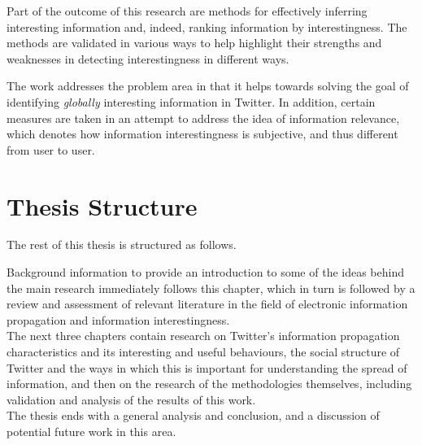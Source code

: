 Part of the outcome of this research are methods for effectively inferring interesting information and, indeed, ranking information by interestingness. The methods are validated in various ways to help highlight their strengths and weaknesses in detecting interestingness in different ways.

The work addresses the problem area in that it helps towards solving the goal of identifying \textit{globally} interesting information in Twitter. In addition, certain measures are taken in an attempt to address the idea of information relevance, which denotes how information interestingness is subjective, and thus different from user to user.


\section{Thesis Structure}
The rest of this thesis is structured as follows.

Background information to provide an introduction to some of the ideas behind the main research immediately follows this chapter, which in turn is followed by a review and assessment of relevant literature in the field of electronic information propagation and information interestingness.\\
The next three chapters contain research on Twitter's information propagation characteristics and its interesting and useful behaviours, the social structure of Twitter and the ways in which this is important for understanding the spread of information, and then on the research of the methodologies themselves, including validation and analysis of the results of this work.\\
The thesis ends with a general analysis and conclusion, and a discussion of potential future work in this area.